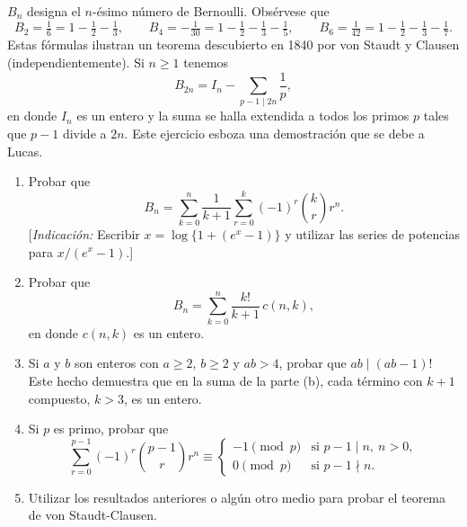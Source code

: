 \documentclass[12pt,a4paper]{book}
\begin{document}
    \begin{ejercicio}
        $B_{n}$ designa el $n$-ésimo número de Bernoulli. Obsérvese que
        \begin{equation*}
            B_{2}=\tfrac{1}{6}=1-\tfrac{1}{2}-\tfrac{1}{3},\qquad B_{4}=-\tfrac{1}{30}=1-\tfrac{1}{2}-\tfrac{1}{3}-\tfrac{1}{5},\qquad B_{6}=\tfrac{1}{42}=1-\tfrac{1}{2}-\tfrac{1}{3}-\tfrac{1}{7}.
        \end{equation*}
        Estas fórmulas ilustran un teorema descubierto en 1840 por von Staudt y Clausen
        (independientemente). Si $n\geq1$ tenemos
        \begin{equation*}
            B_{2n}=I_{n}-\sum_{p-1\mid2n}\frac{1}{p},
        \end{equation*}
        en donde $I_{n}$ es un entero y la suma se halla extendida a todos los primos $p$ tales
        que $p-1$ divide a $2n$. Este ejercicio esboza una demostración que se debe a Lucas.
        \begin{enumerate}
            \item[(a)] Probar que
            \begin{equation*}
                B_{n}=\sum_{k=0}^{n}\frac{1}{k+1}\sum_{r=0}^{k}(-1)^{r}\binom{k}{r}r^{n}.
            \end{equation*}
            [\textit{Indicación:} Escribir $x=\log\{1+(e^{x}-1)\}$ y utilizar las series de
            potencias para $x/(e^{x}-1)$.]
            \item[(b)] Probar que
            \begin{equation*}
                B_{n}=\sum_{k=0}^{n}\frac{k!}{k+1}\,c(n,k),
            \end{equation*}
            en donde $c(n,k)$ es un entero.
            \item[(c)] Si $a$ y $b$ son enteros con $a\geq2$, $b\geq2$ y $ab>4$, probar que
            $ab\mid(ab-1)!$ Este hecho demuestra que en la suma de la parte (b), cada término
            con $k+1$ compuesto, $k>3$, es un entero.
            \item[(d)] Si $p$ es primo, probar que
            \begin{equation*}
                \sum_{r=0}^{p-1}(-1)^{r}\binom{p-1}{r}r^{n}\equiv
                \begin{cases}
                    -1\pmod{p}&\text{si }p-1\mid n,\ n>0,\\
                    0\pmod{p}&\text{si }p-1\nmid n.
                \end{cases}
            \end{equation*}
            \item[(e)] Utilizar los resultados anteriores o algún otro medio para probar el
            teorema de von Staudt-Clausen.
        \end{enumerate}
    \end{ejercicio}
\end{document}
